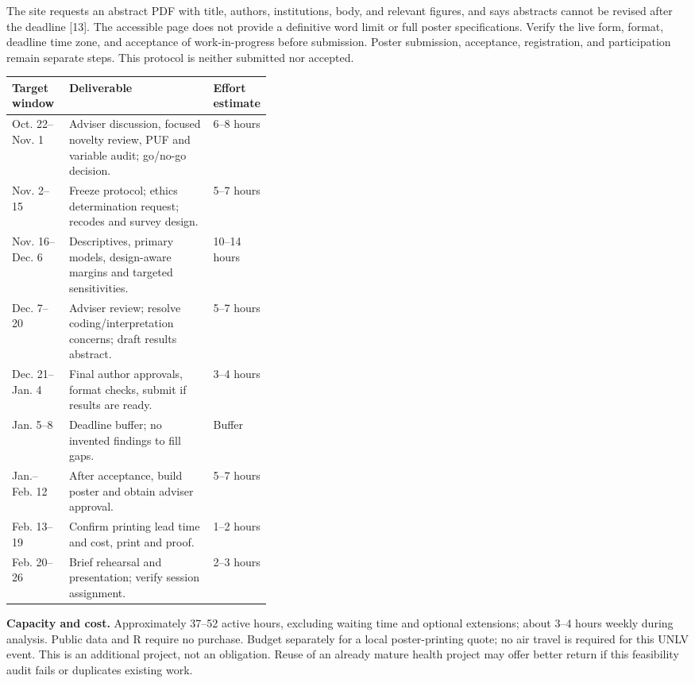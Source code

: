\documentclass[10pt]{article}
\begin{document}
The site requests an abstract PDF with title, authors, institutions, body, and relevant figures, and says abstracts cannot be revised after the deadline [13]. The accessible page does not provide a definitive word limit or full poster specifications. Verify the live form, format, deadline time zone, and acceptance of work-in-progress before submission. Poster submission, acceptance, registration, and participation remain separate steps. This protocol is neither submitted nor accepted.

\begin{tabularx}{\linewidth}{@{}p{0.22\linewidth}Xp{0.16\linewidth}@{}}\toprule
Target window & Deliverable & Effort estimate\\\midrule
Oct. 22--Nov. 1 & Adviser discussion, focused novelty review, PUF and variable audit; go/no-go decision. & 6--8 hours\\
Nov. 2--15 & Freeze protocol; ethics determination request; recodes and survey design. & 5--7 hours\\
Nov. 16--Dec. 6 & Descriptives, primary models, design-aware margins and targeted sensitivities. & 10--14 hours\\
Dec. 7--20 & Adviser review; resolve coding/interpretation concerns; draft results abstract. & 5--7 hours\\
Dec. 21--Jan. 4 & Final author approvals, format checks, submit if results are ready. & 3--4 hours\\
Jan. 5--8 & Deadline buffer; no invented findings to fill gaps. & Buffer\\
Jan.--Feb. 12 & After acceptance, build poster and obtain adviser approval. & 5--7 hours\\
Feb. 13--19 & Confirm printing lead time and cost, print and proof. & 1--2 hours\\
Feb. 20--26 & Brief rehearsal and presentation; verify session assignment. & 2--3 hours\\\bottomrule
\end{tabularx}

\textbf{Capacity and cost.} Approximately 37--52 active hours, excluding waiting time and optional extensions; about 3--4 hours weekly during analysis. Public data and R require no purchase. Budget separately for a local poster-printing quote; no air travel is required for this UNLV event. This is an additional project, not an obligation. Reuse of an already mature health project may offer better return if this feasibility audit fails or duplicates existing work.
\end{document}
